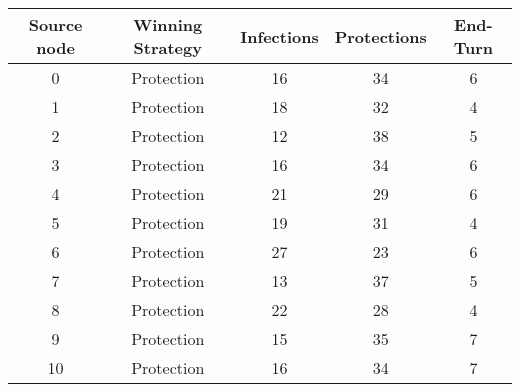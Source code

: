 \documentclass[results.tex]{subfiles}
\begin{document}
    \begin{center}
        \begin{tabular}{| c || c | c | c | c |}
            \hline
            {\bfseries Source node} & {\bfseries Winning Strategy} & {\bfseries Infections} & {\bfseries Protections}
            & {\bfseries End-Turn}
            \\  %
            \hline\hline
            0                       & Protection                   & 16                     & 34                      & 6                    \\
            \hline
            1                       & Protection                   & 18                     & 32                      & 4                    \\
            \hline
            2                       & Protection                   & 12                     & 38                      & 5                    \\
            \hline
            3                       & Protection                   & 16                     & 34                      & 6                    \\
            \hline
            4                       & Protection                   & 21                     & 29                      & 6                    \\
            \hline
            5                       & Protection                   & 19                     & 31                      & 4                    \\
            \hline
            6                       & Protection                   & 27                     & 23                      & 6                    \\
            \hline
            7                       & Protection                   & 13                     & 37                      & 5                    \\
            \hline
            8                       & Protection                   & 22                     & 28                      & 4                    \\
            \hline
            9                       & Protection                   & 15                     & 35                      & 7                    \\
            \hline
            10                      & Protection                   & 16                     & 34                      & 7                    \\

\end{tabular}
\end{center}
\end{document}
